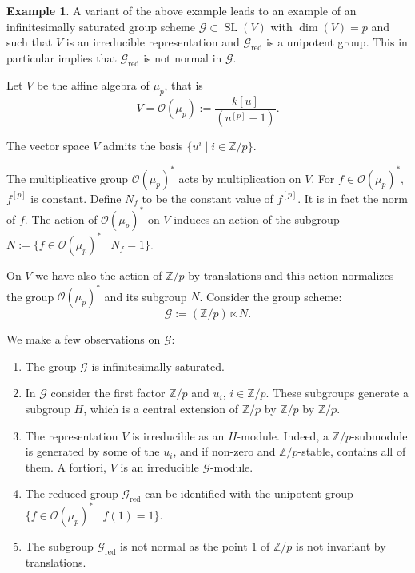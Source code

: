 \documentclass[11pt,a4paper]{article}
\theoremstyle{plain}
\theoremstyle{definition}
\newtheorem{example}[theorem]{Example}
\DeclareMathOperator{\SL}{SL}
\newcommand{\ZZ}{\mathbb{Z}}
\newcommand{\red}{\mathrm{red}}
\begin{document}
\begin{example} \label{ex:3.7}
A variant of the above example leads to an example of an infinitesimally saturated group scheme $\mathcal{G} \subset \SL(V)$ with $\dim(V) = p$ and such that $V$ is an irreducible representation and $\mathcal{G}_\red$ is a unipotent group. This in particular implies that $\mathcal{G}_\red$ is not normal in $\mathcal{G}$.

Let $V$ be the affine algebra of $\mu_p$, that is
\begin{equation} \label{eq:3.7.1}
V = \mathcal{O}(\mu_p) := \frac{k[u]}{(u^{[p]} - 1)}.
\end{equation}

The vector space $V$ admits the basis $\{u^i \mid i \in \ZZ/p\}$.

The multiplicative group $\mathcal{O}(\mu_p)^*$ acts by multiplication on $V$. For $f \in \mathcal{O}(\mu_p)^*$, $f^{[p]}$ is constant. Define $N_f$ to be the constant value of $f^{[p]}$. It is in fact the norm of $f$. The action of $\mathcal{O}(\mu_p)^*$ on $V$ induces an action of the subgroup $N := \{f \in \mathcal{O}(\mu_p)^* \mid N_f = 1\}$.

On $V$ we have also the action of $\ZZ/p$ by translations and this action normalizes the group $\mathcal{O}(\mu_p)^*$ and its subgroup $N$. Consider the group scheme:
\begin{equation} \label{eq:3.7.2}
\mathcal{G} := (\ZZ/p) \ltimes N.
\end{equation}

We make a few observations on $\mathcal{G}$:
\begin{enumerate}
\item The group $\mathcal{G}$ is infinitesimally saturated.
\item In $\mathcal{G}$ consider the first factor $\ZZ/p$ and $u_i$, $i \in \ZZ/p$. These subgroups generate a subgroup $H$, which is a central extension of $\ZZ/p$ by $\ZZ/p$ by $\ZZ/p$.
\item The representation $V$ is irreducible as an $H$-module. Indeed, a $\ZZ/p$-submodule is generated by some of the $u_i$, and if non-zero and $\ZZ/p$-stable, contains all of them. A fortiori, $V$ is an irreducible $\mathcal{G}$-module.
\item The reduced group $\mathcal{G}_\red$ can be identified with the unipotent group $\{f \in \mathcal{O}(\mu_p)^* \mid f(1) = 1\}$.
\item The subgroup $\mathcal{G}_\red$ is not normal as the point $1$ of $\ZZ/p$ is not invariant by translations.
\end{enumerate}
\end{example}
\end{document}
